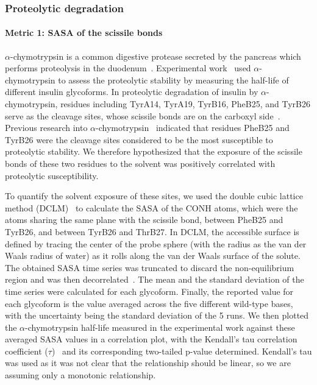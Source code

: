 \documentclass[9pt]{elife}
\begin{document}
\subsubsection{Proteolytic degradation}
\paragraph{Metric 1: SASA of the scissile bonds}
$\alpha$-chymotrypsin is a common digestive protease secreted by the pancreas which performs proteolysis in the duodenum~\cite{wilcox19705}. Experimental work~\cite{guan2018chemically} used $\alpha$-chymotrypsin to assess the proteolytic stability by measuring the half-life of different insulin glycoforms. In proteolytic degradation of insulin by $\alpha$-chymotrypsin, residues including TyrA14, TyrA19, TyrB16, PheB25, and TyrB26 serve as the cleavage sites, whose scissile bonds are on the carboxyl side~\cite{schilling1991degradation}. Previous research into $\alpha$-chymotrypsin~\cite{schilling1991degradation} indicated that residues PheB25 and TyrB26 were the cleavage sites considered to be the most susceptible to proteolytic stability. We therefore hypothesized that the exposure of the scissile bonds of these two residues to the solvent was positively correlated with proteolytic susceptibility. 

To quantify the solvent exposure of these sites, we used the double cubic lattice method (DCLM)~\cite{eisenhaber1995double} to calculate the SASA of the CONH atoms, which were the atoms sharing the same plane with the scissile bond, between PheB25 and TyrB26, and between TyrB26 and ThrB27. In DCLM, the accessible surface is defined by tracing the center of the probe sphere (with the radius as the van der Waals radius of water) as it rolls along the van der Waals surface of the solute.  The obtained SASA time series was truncated to discard the non-equilibrium region and was then decorrelated~\cite{chodera2016simple}. The mean and the standard deviation of the time series were calculated for each glycoform. Finally, the reported value for each glycoform is the value averaged across the five different wild-type bases, with the uncertainty being the standard deviation of the 5 runs. We then plotted the $\alpha$-chymotrypsin half-life measured in the experimental work against these averaged SASA values in a correlation plot, with the Kendall's tau correlation coefficient ($\tau$)~\cite{kendall1948advanced} and its corresponding two-tailed p-value determined. Kendall's tau was used as it was not clear that the relationship should be linear, so we are assuming only a monotonic relationship.
\end{document}
